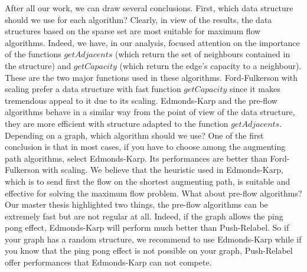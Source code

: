 
After all our work, we can draw several conclusions. First, which data structure should we use for each algorithm? Clearly, in view of the results, the data structures based on the sparse set are most suitable for maximum flow algorithms. Indeed, we have, in our analysis, focused attention on the importance of the functions $getAdjacents$ (which return the set of neighbours contained in the structure) and $getCapacity$ (which return the edge's capacity to a neighbour). These are the two major functions used in these algorithms. Ford-Fulkerson with scaling prefer a data structure with fast function $getCapacity$ since it makes tremendous appeal to it due to its scaling. Edmonds-Karp and the pre-flow algorithms behave in a similar way from the point of view of the data structure, they are more efficient with structure adapted to the function $getAdjacents$.
\\

Depending on a graph, which algorithm should we use? One of the first conclusion is that in most cases, if you have to choose among the augmenting path algorithms, select Edmonds-Karp. Its performances are better than Ford-Fulkerson with scaling. We believe that the heuristic used in Edmonds-Karp, which is to send first the flow on the shortest augmenting path, is suitable and effective for solving the maximum flow problem. What about pre-flow algorithms? Our master thesis highlighted two things, the pre-flow algorithms can be extremely fast but are not regular at all. Indeed, if the graph allows the ping pong effect, Edmonds-Karp will perform much better than Push-Relabel. So if your graph has a random structure, we recommend to use Edmonds-Karp while if you know that the ping pong effect is not possible on your graph, Push-Relabel offer performances that Edmonds-Karp can not compete.